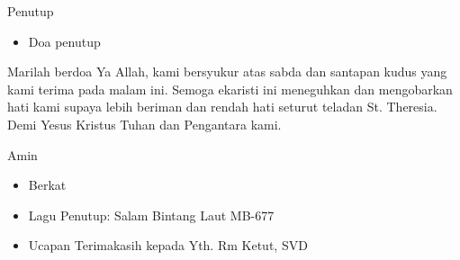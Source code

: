 \documentclass[12pt,a4paper]{beamer}
\begin{document}
\begin{frame}{Penutup}
\begin{itemize}
\item Doa penutup
\end{itemize}
\begin{description}[1cm]
\item [I] 	Marilah berdoa
Ya Allah, kami bersyukur atas sabda dan santapan kudus yang kami terima pada malam ini. Semoga ekaristi ini meneguhkan dan mengobarkan hati  kami supaya lebih beriman dan rendah hati seturut teladan St. Theresia. Demi Yesus Kristus Tuhan dan Pengantara kami. 
\item [U] 	Amin
\end{description}


\begin{itemize}
\item Berkat 
\item Lagu Penutup: Salam Bintang Laut MB-677
\item Ucapan Terimakasih kepada Yth. Rm Ketut, SVD
\end{itemize}
\end{frame}
\end{document}
